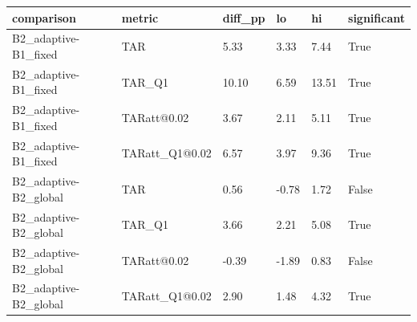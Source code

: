 \begin{tabular}{llllll}
\hline
comparison & metric & diff\_pp & lo & hi & significant \\
\hline
B2\_adaptive-B1\_fixed & TAR & 5.33 & 3.33 & 7.44 & True \\
B2\_adaptive-B1\_fixed & TAR\_Q1 & 10.10 & 6.59 & 13.51 & True \\
B2\_adaptive-B1\_fixed & TARatt@0.02 & 3.67 & 2.11 & 5.11 & True \\
B2\_adaptive-B1\_fixed & TARatt\_Q1@0.02 & 6.57 & 3.97 & 9.36 & True \\
B2\_adaptive-B2\_global & TAR & 0.56 & -0.78 & 1.72 & False \\
B2\_adaptive-B2\_global & TAR\_Q1 & 3.66 & 2.21 & 5.08 & True \\
B2\_adaptive-B2\_global & TARatt@0.02 & -0.39 & -1.89 & 0.83 & False \\
B2\_adaptive-B2\_global & TARatt\_Q1@0.02 & 2.90 & 1.48 & 4.32 & True \\
\hline
\end{tabular}
